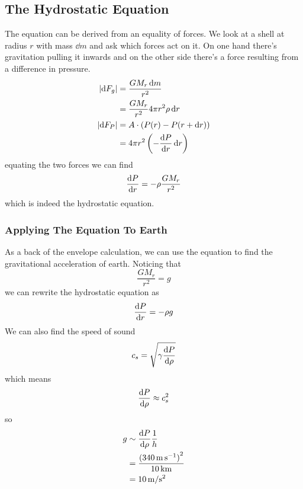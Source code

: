 \subsection{The Hydrostatic Equation}
The equation can be derived from an equality of forces. We look at a shell at radius \(r\) with mass \(\dd m\) and ask which forces act on it. On one hand there's gravitation pulling it inwards and on the other side there's a force resulting from a difference in pressure.
\begin{align}
	\lvert \dd F_g \rvert &= \frac{GM_r\dd m}{r^2}\\
	&= \frac{GM_r}{r^2}4\pi r^2\rho \dd r\\
	\lvert\dd F_P\rvert &= A\cdot\ins{P(r)-P(r+\dd r)}\\
	&= 4\pi r^2\ins{-\diff{P}{r}\dd r}
\end{align}
equating the two forces we can find
\begin{align}
	\diff{P}{r} = -\rho\frac{GM_r}{r^2}
\end{align}
which is indeed the hydrostatic equation.
\subsubsection{Applying The Equation To Earth}
As a back of the envelope calculation, we can use the equation to find the gravitational acceleration of earth. Noticing that
\begin{equation}
	\frac{GM_r}{r^2} = g
\end{equation}
we can rewrite the hydrostatic equation as
\begin{equation}
	\diff{P}{r} = -\rho g
\end{equation}
We can also find the speed of sound
\begin{equation}
	c_s = \sqrt{\gamma \diff{P}{\rho}}
\end{equation}
which means
\begin{equation}
	\diff{P}{\rho} \approx c_s^2
\end{equation}
so
\begin{align}
	g &\sim \diff{P}{\rho}\frac{1}{h}\\
	&= \frac{{(\SI{340}{\meter\per\second})}^2}{\SI{10}{\kilo\meter}}\\
	&= \SI{10}{\meter\per\second^2}
\end{align}